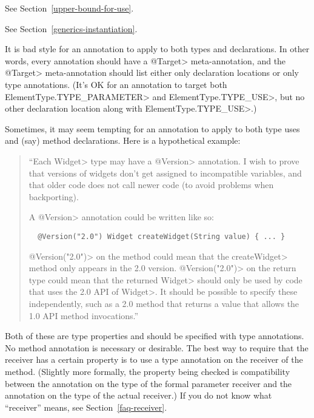 
See Section~\ref{upper-bound-for-use}.



See Section~\ref{generics-instantiation}.



It is bad style for an annotation to apply to both types and declarations.
In other words, every annotation should have a \<@Target> meta-annotation,
and the \<@Target> meta-annotation should list either only declaration
locations or only type annotations.  (It's OK for an annotation to target
both \<ElementType.TYPE\_PARAMETER> and \<ElementType.TYPE\_USE>, but no
other declaration location along with \<ElementType.TYPE\_USE>.)

Sometimes, it may seem tempting for an annotation to apply to both type
uses and (say) method declarations.  Here is a hypothetical example:

\begin{quote}
  ``Each \<Widget> type may have a \<@Version> annotation.
  I wish to prove that versions of widgets don't get assigned to
  incompatible variables, and that older code does not call newer code (to
  avoid problems when backporting).

  A \<@Version> annotation could be written like so:

\begin{Verbatim}
  @Version("2.0") Widget createWidget(String value) { ... }
\end{Verbatim}

\<@Version("2.0")> on the method could mean that the \<createWidget> method
only appears in the 2.0 version.  \<@Version("2.0")> on the return type
could mean that the returned \<Widget> should only be used by code that
uses the 2.0 API of \<Widget>.  It should be possible to specify these
independently, such as a 2.0 method that returns a value that allows the
1.0 API method invocations.''
\end{quote}

Both of these are type properties and should be specified with type
annotations.  No method annotation is necessary or desirable.  The best way
to require that the receiver has a certain property is to use a type
annotation on the receiver of the method.  (Slightly more formally, the
property being checked is compatibility between the annotation on the type
of the formal parameter receiver and the annotation on the type of the
actual receiver.)  If you do not know what ``receiver'' means, see
Section~\ref{faq-receiver}.

